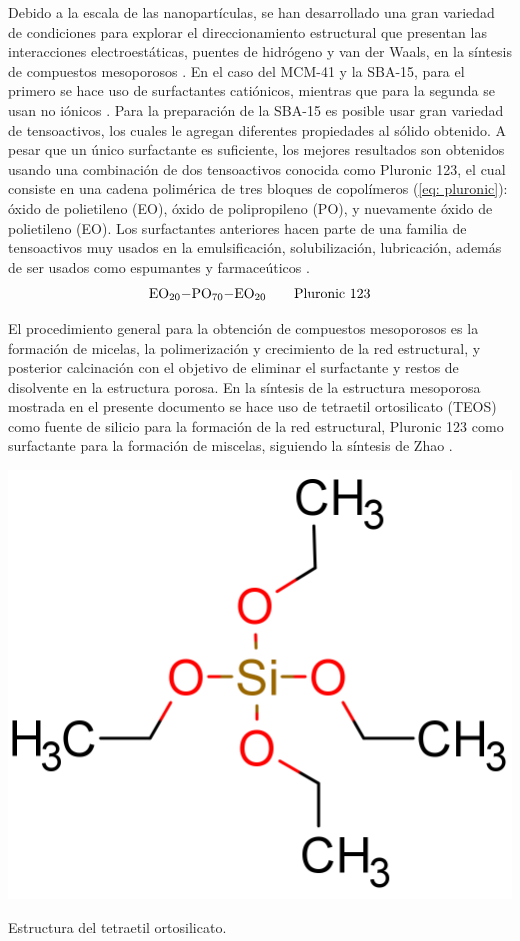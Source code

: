 \documentclass[fleqn,11pt]{SelfArx}
\begin{document}
	Debido a la escala de las nanopart\'iculas, se han desarrollado una gran variedad de condiciones para explorar el direccionamiento estructural que presentan las interacciones electroest\'aticas, puentes de hidr\'ogeno y van der Waals, en la s\'intesis de compuestos mesoporosos \cite{zhao_1998}. En el caso del MCM-41 y la SBA-15, para el primero se hace uso de surfactantes cati\'onicos, mientras que para la segunda se usan no i\'onicos \cite{zhao_1998}. Para la preparaci\'on de la SBA-15 es posible usar gran variedad de tensoactivos, los cuales le agregan diferentes propiedades al s\'olido obtenido. A pesar que un \'unico surfactante es suficiente, los mejores resultados son obtenidos usando una combinaci\'on de dos tensoactivos conocida como Pluronic 123, el cual consiste en una cadena polim\'erica de tres bloques de copol\'imeros (\autoref{eq: pluronic}): \'oxido de polietileno (EO), \'oxido de polipropileno (PO), y nuevamente \'oxido de polietileno (EO). Los surfactantes anteriores hacen parte de una familia de tensoactivos muy usados en la emulsificaci\'on, solubilizaci\'on, lubricaci\'on, adem\'as de ser usados como espumantes y farmace\'uticos \cite{zhao_1998}.
	\begin{equation} \label{eq: pluronic}
	\ce{EO_{20}-PO_{70}-EO_{20}} \qquad \text{Pluronic 123}
	\end{equation}
	
	El procedimiento general para la obtenci\'on de compuestos mesoporosos es la formaci\'on de micelas, la polimerizaci\'on y crecimiento de la red estructural, y posterior calcinaci\'on con el objetivo de eliminar el surfactante y restos de disolvente en la estructura porosa.	En la s\'intesis de la estructura mesoporosa mostrada en el presente documento se hace uso de tetraetil ortosilicato (TEOS) como fuente de silicio para la formaci\'on de la red estructural, Pluronic 123 como surfactante para la formaci\'on de miscelas, siguiendo la s\'intesis de Zhao \cite{zhao_1998}.
	
	\begin{scheme}[h]
		\centering
		\includegraphics[width=0.4\linewidth]{structures/silicate.png}
		
		\caption{Estructura del tetraetil ortosilicato.}
		\label{scheme: sources}
	\end{scheme}
	
\end{document}
